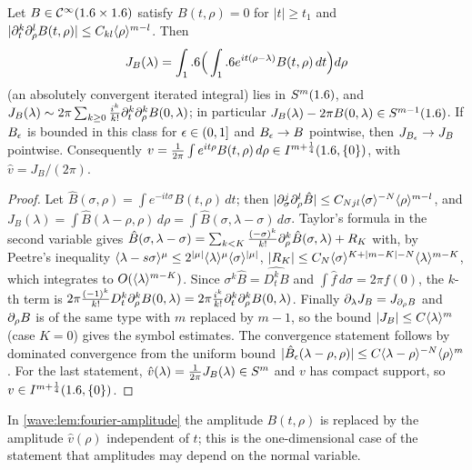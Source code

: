 \begin{lemma}\label{wave:lem:fourier-amplitude}
Let $B\in\mathcal{C}^\infty(1.6\times1.6)$ satisfy $B(t,\rho)=0$ for $|t|\ge t_1$ and
$|\partial_t^k\partial_\rho^lB(t,\rho)|\le C_{kl}\langle \rho\rangle^{m-l}$. Then
\begin{equation*}
J_B(\lambda)=\int_1.6\Big(\int_1.6 e^{it(\rho-\lambda)}B(t,\rho)\,dt\Big)d\rho
\end{equation*}
(an absolutely convergent iterated integral) lies in $S^{m}(1.6)$, and
$J_B(\lambda)\sim2\pi\sum_{k\ge0}\frac{i^k}{k!}\partial_t^k\partial_\rho^kB(0,\lambda)$; in particular
$J_B(\lambda)-2\pi B(0,\lambda)\in S^{m-1}(1.6)$. If $B_\epsilon$ is bounded in this class
for $\epsilon\in(0,1]$ and $B_\epsilon\to B$ pointwise, then $J_{B_\epsilon}\to J_B$ pointwise.
Consequently $v=\frac1{2\pi}\int e^{it\rho}B(t,\rho)\,d\rho\in I^{m+\frac14}(1.6,\{0\})$, with
$\hat v=J_B/(2\pi)$.
\end{lemma}
\begin{proof}
Let $\hat B(\sigma,\rho)=\int e^{-it\sigma}B(t,\rho)\,dt$; then
$|\partial_\sigma^j\partial_\rho^l\hat B|\le C_{Njl}\langle \sigma\rangle^{-N}\langle \rho\rangle^{m-l}$, and
$J_B(\lambda)=\int\hat B(\lambda-\rho,\rho)\,d\rho=\int\hat B(\sigma,\lambda-\sigma)\,d\sigma$. Taylor's
formula in the second variable gives
$\hat B(\sigma,\lambda-\sigma)=\sum_{k<K}\frac{(-\sigma)^k}{k!}\partial_\rho^k\hat B(\sigma,\lambda)+R_K$ with,
by Peetre's inequality $\langle \lambda-s\sigma\rangle^{\mu}\le2^{|\mu|}\langle \lambda\rangle^{\mu}\langle \sigma\rangle^{|\mu|}$,
$|R_K|\le C_N\langle \sigma\rangle^{K+|m-K|-N}\langle \lambda\rangle^{m-K}$, which integrates to
$O(\langle \lambda\rangle^{m-K})$. Since $\sigma^k\hat B=\widehat{D_t^kB}$ and $\int\hat f\,d\sigma=2\pi f(0)$, the
$k$-th term is $2\pi\frac{(-1)^k}{k!}D_t^k\partial_\rho^kB(0,\lambda)=2\pi\frac{i^k}{k!}\partial_t^k\partial_\rho^kB(0,\lambda)$.
Finally $\partial_\lambda J_B=J_{\partial_\rho B}$ and $\partial_\rho B$ is of the same type with $m$
replaced by $m-1$, so the bound $|J_B|\le C\langle \lambda\rangle^m$ (case $K=0$) gives the symbol
estimates. The convergence statement follows by dominated convergence from the
uniform bound $|\hat B_\epsilon(\lambda-\rho,\rho)|\le C\langle \lambda-\rho\rangle^{-N}\langle \rho\rangle^m$. For the last
statement, $\hat v(\lambda)=\frac1{2\pi}J_B(\lambda)\in S^{m}$ and $v$ has compact support,
so $v\in I^{m+\frac14}(1.6,\{0\})$.
\end{proof}

In \cref{wave:lem:fourier-amplitude} the amplitude $B(t,\rho)$ is replaced by the
amplitude $\hat v(\rho)$ independent of $t$; this is the one-dimensional case of
the statement that amplitudes may depend on the normal variable.

